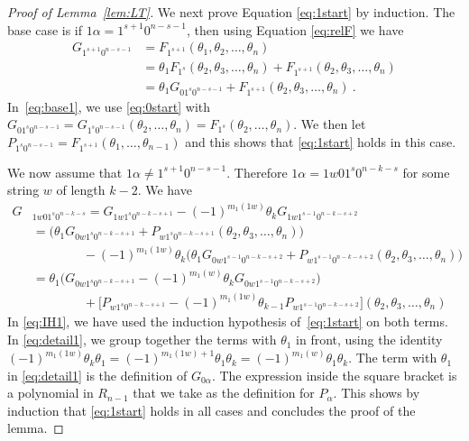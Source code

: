 \documentclass[11pt]{amsart}
\theoremstyle{definition}
\numberwithin{equation}{section}
\begin{document}
\begin{proof}[Proof of Lemma~\ref{lem:LT}]
We next prove Equation \eqref{eq:1start} by induction.  The base case is if $1\alpha = 1^{s+1}0^{n-s-1}$,
then using Equation \eqref{eq:relF} we have
\begin{align}
G_{1^{s+1}0^{n-s-1}} &= F_{1^{s+1}}(\theta_1,\theta_2 ,\ldots,\theta_n) \nonumber\\
&= \theta_1 F_{1^s} (\theta_2, \theta_3, \ldots, \theta_n)+ F_{1^{s+1}}(\theta_2, \theta_3, \ldots, \theta_n)\nonumber \\
&= \theta_1 G_{01^s0^{n-s-1}} + F_{1^{s+1}}(\theta_2, \theta_3, \ldots, \theta_n)~.\label{eq:base1}
\end{align}
In~\eqref{eq:base1}, we use \eqref{eq:0start} with  $G_{01^s0^{n-s-1}}=G_{1^s0^{n-s-1}} (\theta_2,  \ldots, \theta_n)=F_{1^s} (\theta_2, \ldots, \theta_n)$.
We then let
$P_{1^{s}0^{n-s-1}} = F_{1^{s+1}}(\theta_1,\ldots,\theta_{n-1})$ and this shows that \eqref{eq:1start} holds in this case.

We now assume that $1\alpha\ne 1^{s+1}0^{n-s-1}$. Therefore $1\alpha=1w01^s0^{n-k-s}$ for some string $w$
of length $k-2$. We have
\begin{align}
	G&_{1w01^s0^{n-k-s}}= G_{1w1^s0^{n-k-s+1}} -  (-1)^{m_1(1w)} \theta_k G_{1w1^{s-1}0^{n-k-s+2}} \nonumber \\
	 & = \big(\theta_1G_{0w1^s0^{n-k-s+1}} +P_{w1^s0^{n-k-s+1}}(\theta_2,\theta_3 ,\ldots,\theta_n)\big) \label{eq:IH1}\\
	 &\qquad\qquad  - (-1)^{m_1(1w)} \theta_k  \big(\theta_1G_{0w1^{s-1}0^{n-k-s+2}} +P_{w1^{s-1}0^{n-k-s+2}}(\theta_2,\theta_3 ,\ldots,\theta_n)\big) \nonumber\\
	 & = \theta_1\big(G_{0w1^s0^{n-k-s+1}}   - (-1)^{m_1(w)}  \theta_k G_{0w1^{s-1}0^{n-k-s+2}}\big)	 \label{eq:detail1}\\
	 &\qquad\qquad  + \big[P_{w1^s0^{n-k-s+1}}  - (-1)^{m_1(1w)} \theta_{k-1} P_{w1^{s-1}0^{n-k-s+2}}\big] (\theta_2,\theta_3 ,\ldots,\theta_n)\nonumber
\end{align}
In \eqref{eq:IH1}, we have used the induction hypothesis of~\eqref{eq:1start} on both terms.
In  \eqref{eq:detail1}, we group together the terms with $\theta_1$ in front, using the identity
$(-1)^{m_1(1w)} \theta_k \theta_1 = (-1)^{m_1(1w)+1} \theta_1 \theta_k  = (-1)^{m_1(w)} \theta_1 \theta_k $.
The term with $\theta_1$ in \eqref{eq:detail1} is the definition of $G_{0\alpha}$.
The expression inside the square bracket is a polynomial in $R_{n-1}$ that we take as the definition for $P_\alpha$.
This shows by induction that \eqref{eq:1start}
holds in all cases and concludes the  proof of the lemma.
\end{proof}
\end{document}
